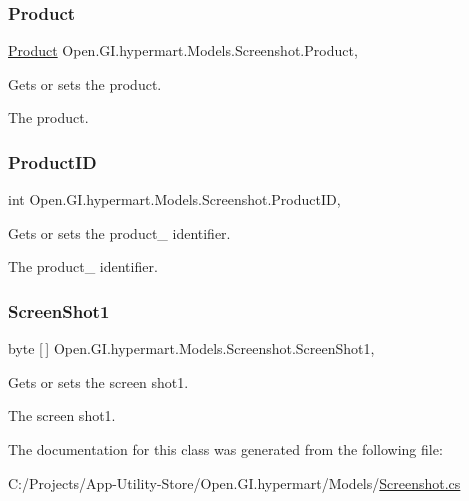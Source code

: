 \subsubsection{\texorpdfstring{Product}{Product}\hspace{0.1cm}{\footnotesize\ttfamily [2/2]}}
{\footnotesize\ttfamily \hyperlink{class_open_1_1_g_i_1_1hypermart_1_1_models_1_1_product}{Product} Open.\+G\+I.\+hypermart.\+Models.\+Screenshot.\+Product\hspace{0.3cm}{\ttfamily [get]}, {\ttfamily [set]}}



Gets or sets the product. 

The product. \hypertarget{class_open_1_1_g_i_1_1hypermart_1_1_models_1_1_screenshot_ad381abf51bb0ebb1c2566c70df11c05a}{}\label{class_open_1_1_g_i_1_1hypermart_1_1_models_1_1_screenshot_ad381abf51bb0ebb1c2566c70df11c05a} 
\subsubsection{\texorpdfstring{Product\+ID}{ProductID}}
{\footnotesize\ttfamily int Open.\+G\+I.\+hypermart.\+Models.\+Screenshot.\+Product\+ID\hspace{0.3cm}{\ttfamily [get]}, {\ttfamily [set]}}



Gets or sets the product\+\_\+ identifier. 

The product\+\_\+ identifier. \hypertarget{class_open_1_1_g_i_1_1hypermart_1_1_models_1_1_screenshot_a435ca1863d66de2de497d603585610d8}{}\label{class_open_1_1_g_i_1_1hypermart_1_1_models_1_1_screenshot_a435ca1863d66de2de497d603585610d8} 
\subsubsection{\texorpdfstring{Screen\+Shot1}{ScreenShot1}}
{\footnotesize\ttfamily byte \mbox{[}$\,$\mbox{]} Open.\+G\+I.\+hypermart.\+Models.\+Screenshot.\+Screen\+Shot1\hspace{0.3cm}{\ttfamily [get]}, {\ttfamily [set]}}



Gets or sets the screen shot1. 

The screen shot1. 

The documentation for this class was generated from the following file\+:\begin{DoxyCompactItemize}
\item 
C\+:/\+Projects/\+App-\/\+Utility-\/\+Store/\+Open.\+G\+I.\+hypermart/\+Models/\hyperlink{_models_2_screenshot_8cs}{Screenshot.\+cs}\end{DoxyCompactItemize}
